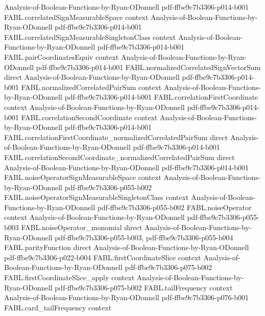 \begin{theorem}
  {Analysis-of-Boolean-Functions-by-Ryan-ODonnell}
  {pdf-ffbe9c7b3306-p014-b001}
\proofstep
  {FABL.correlatedSignMeasurableSpace}
  {context}
  {Analysis-of-Boolean-Functions-by-Ryan-ODonnell}
  {pdf-ffbe9c7b3306-p014-b001}
\proofstep
  {FABL.correlatedSignMeasurableSingletonClass}
  {context}
  {Analysis-of-Boolean-Functions-by-Ryan-ODonnell}
  {pdf-ffbe9c7b3306-p014-b001}
\proofstep
  {FABL.pairCoordinatesEquiv}
  {context}
  {Analysis-of-Boolean-Functions-by-Ryan-ODonnell}
  {pdf-ffbe9c7b3306-p014-b001}
\proofstep
  {FABL.normalizedCorrelatedSignVectorSum}
  {direct}
  {Analysis-of-Boolean-Functions-by-Ryan-ODonnell}
  {pdf-ffbe9c7b3306-p014-b001}
\proofstep
  {FABL.normalizedCorrelatedPairSum}
  {context}
  {Analysis-of-Boolean-Functions-by-Ryan-ODonnell}
  {pdf-ffbe9c7b3306-p014-b001}
\proofstep
  {FABL.correlationFirstCoordinate}
  {context}
  {Analysis-of-Boolean-Functions-by-Ryan-ODonnell}
  {pdf-ffbe9c7b3306-p014-b001}
\proofstep
  {FABL.correlationSecondCoordinate}
  {context}
  {Analysis-of-Boolean-Functions-by-Ryan-ODonnell}
  {pdf-ffbe9c7b3306-p014-b001}
\proofstep
  {FABL.correlationFirstCoordinate_normalizedCorrelatedPairSum}
  {direct}
  {Analysis-of-Boolean-Functions-by-Ryan-ODonnell}
  {pdf-ffbe9c7b3306-p014-b001}
\proofstep
  {FABL.correlationSecondCoordinate_normalizedCorrelatedPairSum}
  {direct}
  {Analysis-of-Boolean-Functions-by-Ryan-ODonnell}
  {pdf-ffbe9c7b3306-p014-b001}
\proofstep
  {FABL.noiseOperatorSignMeasurableSpace}
  {context}
  {Analysis-of-Boolean-Functions-by-Ryan-ODonnell}
  {pdf-ffbe9c7b3306-p055-b002}
\proofstep
  {FABL.noiseOperatorSignMeasurableSingletonClass}
  {context}
  {Analysis-of-Boolean-Functions-by-Ryan-ODonnell}
  {pdf-ffbe9c7b3306-p055-b002}
\proofstep
  {FABL.noiseOperator}
  {context}
  {Analysis-of-Boolean-Functions-by-Ryan-ODonnell}
  {pdf-ffbe9c7b3306-p055-b003}
\proofstep
  {FABL.noiseOperator_monomial}
  {direct}
  {Analysis-of-Boolean-Functions-by-Ryan-ODonnell}
  {pdf-ffbe9c7b3306-p055-b003,
    pdf-ffbe9c7b3306-p055-b004}
\proofstep
  {FABL.parityFunction}
  {direct}
  {Analysis-of-Boolean-Functions-by-Ryan-ODonnell}
  {pdf-ffbe9c7b3306-p022-b004}
\proofstep
  {FABL.firstCoordinateSlice}
  {context}
  {Analysis-of-Boolean-Functions-by-Ryan-ODonnell}
  {pdf-ffbe9c7b3306-p075-b002}
\proofstep
  {FABL.firstCoordinateSlice_apply}
  {context}
  {Analysis-of-Boolean-Functions-by-Ryan-ODonnell}
  {pdf-ffbe9c7b3306-p075-b002}
\proofstep
  {FABL.tailFrequency}
  {context}
  {Analysis-of-Boolean-Functions-by-Ryan-ODonnell}
  {pdf-ffbe9c7b3306-p076-b001}
\proofstep
  {FABL.card_tailFrequency}
  {context}

\end{theorem}
